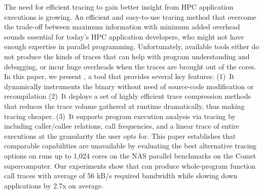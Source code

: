 The need for efficient tracing to gain better insight from
HPC application executions is growing. 
%
An efficient and easy-to-use tracing method that overcome the trade-off
between maximum information with minimum added overhead
sounds essential for today's HPC application developers, who might
not have enough expertise in parallel programming.
% 
Unfortunately, available tools either do not produce the kinds
of traces that can help with program understanding and debugging,
or incur huge overheads when
the traces are brought out of the cores.
%
%
In this paper, we present \parlot, a tool that provides several key
features: (1)~It dynamically instruments the binary without need of source-code modification or recompilation
%
(2)~It deploys a set of highly efficient trace compression methods that reduces the trace volume gathered at runtime dramatically, thus making tracing cheaper.
%
(3)~It supports program execution analysis via tracing by
including caller/callee
relations, call frequencies, and a linear trace of entire executions
at the granularity the user opts for.
%
This paper establishes that comparable capabilities are 
unavailable by evaluating the best alternative tracing options
on runs up to 1,024 cores on the NAS parallel benchmarks on the
Comet supercomputer.
%
Our experiments show that \parlot can produce whole-program function 
call traces with average of 56 kB/s required bandwidth while 
slowing down applications by 2.7x on average. 
